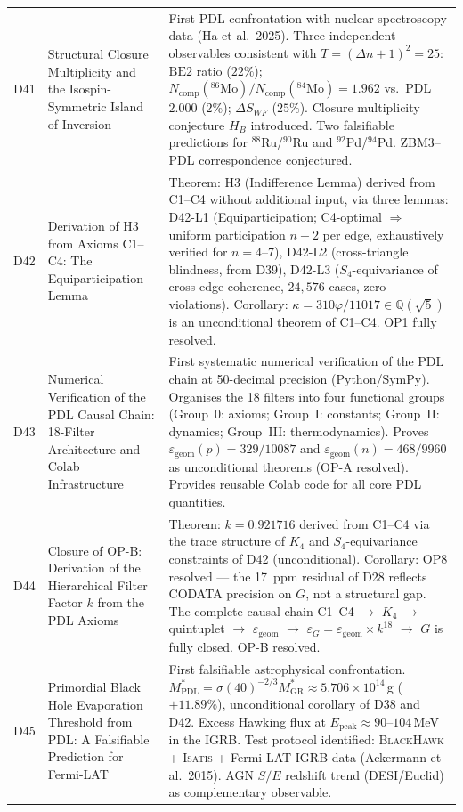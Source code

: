 \documentclass[11pt,a4paper]{article}
\theoremstyle{plain}
\theoremstyle{definition}
\theoremstyle{remark}
\begin{document}
\begin{longtable}{L{1.3cm}L{3.8cm}L{8.0cm}}
D41 & Structural Closure Multiplicity and the Isospin-Symmetric Island of Inversion~\cite{D41} & First PDL confrontation with nuclear spectroscopy data (Ha et al.~2025). Three independent observables consistent with $T=({\Delta n}+1)^2=25$: $\mathrm{BE2}$ ratio ($22\%$); $N_{\mathrm{comp}}(^{86}\mathrm{Mo})/N_{\mathrm{comp}}(^{84}\mathrm{Mo})=1.962$ vs.\ PDL $2.000$ ($2\%$); $\Delta S_{WF}$ ($25\%$). Closure multiplicity conjecture $H_B$ introduced. Two falsifiable predictions for $^{88}$Ru/$^{90}$Ru and $^{92}$Pd/$^{94}$Pd. ZBM3--PDL correspondence conjectured.\\[0.4em]
D42 & Derivation of H3 from Axioms C1--C4: The Equiparticipation Lemma~\cite{D42} & \textcolor{proofblue}{Theorem}: H3 (Indifference Lemma) derived from C1--C4 without additional input, via three lemmas: D42-L1 (Equiparticipation; C4-optimal $\Rightarrow$ uniform participation $n-2$ per edge, exhaustively verified for $n=4$--7), D42-L2 (cross-triangle blindness, from D39), D42-L3 ($S_4$-equivariance of cross-edge coherence, $24{,}576$ cases, zero violations). Corollary: $\kappa=310\varphi/11017\in\mathbb{Q}(\sqrt{5})$ is an unconditional theorem of C1--C4. OP1 fully resolved.\\[0.4em]
D43 & Numerical Verification of the PDL Causal Chain: 18-Filter Architecture and Colab Infrastructure~\cite{D43} & First systematic numerical verification of the PDL chain at 50-decimal precision (Python/SymPy). Organises the 18 filters into four functional groups (Group~0: axioms; Group~I: constants; Group~II: dynamics; Group~III: thermodynamics). Proves $\varepsilon_{\mathrm{geom}}(p) = 329/10087$ and $\varepsilon_{\mathrm{geom}}(n) = 468/9960$ as unconditional theorems (OP-A resolved). Provides reusable Colab code for all core PDL quantities.\\[0.4em]
D44 & Closure of OP-B: Derivation of the Hierarchical Filter Factor $k$ from the PDL Axioms~\cite{D44} & \textcolor{proofblue}{Theorem}: $k = 0.921716$ derived from C1--C4 via the trace structure of $K_4$ and $S_4$-equivariance constraints of D42 (unconditional). Corollary: OP8 resolved --- the 17~ppm residual of D28 reflects CODATA precision on $G$, not a structural gap. The complete causal chain C1--C4 $\to$ $K_4$ $\to$ quintuplet $\to$ $\varepsilon_{\mathrm{geom}}$ $\to$ $\varepsilon_G = \varepsilon_{\mathrm{geom}} \times k^{18}$ $\to$ $G$ is fully closed. OP-B resolved.\\[0.4em]
D45 & Primordial Black Hole Evaporation Threshold from PDL: A Falsifiable Prediction for Fermi-LAT~\cite{D45} & First falsifiable astrophysical confrontation. $M^*_{\mathrm{PDL}} = \sigma(40)^{-2/3} M^*_{\mathrm{GR}} \approx 5.706 \times 10^{14}$\,g ($+11.89\%$), unconditional corollary of D38 and D42. Excess Hawking flux at $E_{\mathrm{peak}} \approx 90$--$104$\,MeV in the IGRB. Test protocol identified: \textsc{BlackHawk} + \textsc{Isatis} + Fermi-LAT IGRB data (Ackermann et al.\ 2015). AGN $S/E$ redshift trend (DESI/Euclid) as complementary observable.\\[0.4em]
\end{longtable}
\end{document}
